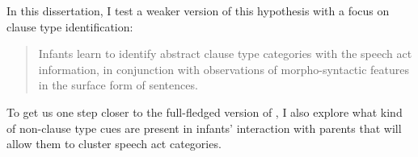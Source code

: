 
In this dissertation, I test a weaker version of this hypothesis with a focus on clause type identification:

\begin{quote}
Infants learn to identify abstract clause type categories with the speech act information, in conjunction with observations of morpho-syntactic features in the surface form of sentences.
\end{quote}


To get us one step closer to the full-fledged version of \hypos{}, I also explore what kind of non-clause type cues are present in infants' interaction with parents that will allow them to cluster speech act categories. 

